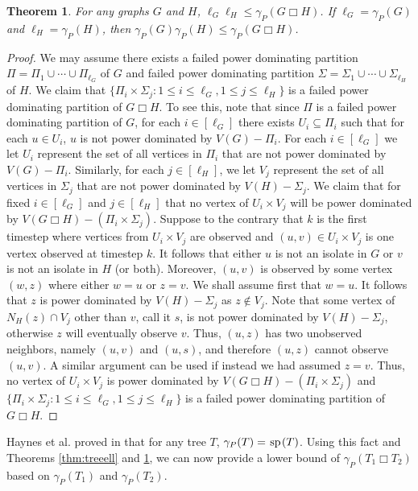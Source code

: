 \documentclass[11pt]{article}
\newtheorem{theorem}{Theorem}
\newcommand{\spider}{\hskip1pt \textrm{sp} \hskip1pt}
\begin{document}
\begin{theorem} For any graphs $G$ and $H$, $\ell_G \ell_H \leq \gamma_P(G \Box H)$. If $\ell_G = \gamma_P(G)$ and $\ell_H = \gamma_P(H)$, then $\gamma_P(G)\gamma_P(H) \leq \gamma_P(G \Box H)$.
\label{cartlowerbound}
\end{theorem}
\begin{proof}
We may assume there exists a failed power dominating partition $\Pi = \Pi_1 \cup \cdots \cup \Pi_{\ell_G}$ of $G$ and failed power dominating partition $\Sigma = \Sigma_1 \cup \cdots \cup \Sigma_{\ell_H}$ of $H$. We claim that $\{\Pi_i\times \Sigma_j: 1 \le i \le \ell_G, 1 \le j \le \ell_H\}$ is a failed power dominating partition of $G\Box H$. To see this, note that since $\Pi$ is a failed power dominating partition of $G$, for each $i \in [\ell_G]$ there exists $U_i \subseteq \Pi_i$ such that  for each $u \in U_i$, $u$ is not power dominated by $V(G) - \Pi_i$. For each $i\in [\ell_G]$ we let $U_i$ represent the set of all vertices in $\Pi_i$ that are not power dominated by $V(G) - \Pi_i$. Similarly, for each $j \in [\ell_H]$, we let $V_j$ represent the set of all vertices in $\Sigma_j$ that are not power dominated by $V(H) - \Sigma_j$. We claim that for fixed $i \in [\ell_G]$ and $j \in [\ell_H]$ that no vertex of $U_i \times V_j$ will be power dominated by $V(G\Box H) - (\Pi_i \times \Sigma_j)$. Suppose to the contrary that $k$ is the first timestep where vertices from $U_i \times V_j$ are observed and $(u, v) \in U_i \times V_j$ is one vertex observed at timestep $k$. It follows that either $u$ is not an isolate in $G$ or $v$ is not an isolate in $H$ (or both). Moreover,  $(u,v)$ is observed by some vertex $(w, z)$ where either $w=u$ or $z=v$. We shall assume first that $w=u$. It follows that $z$ is power dominated by $V(H) - \Sigma_j$ as $z\not\in V_j$. Note that some vertex of $N_H(z) \cap V_j$ other than $v$, call it $s$, is not power dominated by $V(H) - \Sigma_j$, otherwise $z$ will eventually observe $v$. Thus, $(u,z)$ has two unobserved neighbors, namely $(u, v)$ and $(u,s)$, and therefore $(u,z)$ cannot observe $(u,v)$. A similar argument can be used if instead we had assumed $z=v$. Thus, no vertex of $U_i \times V_j$ is power dominated by $V(G\Box H) - (\Pi_i \times \Sigma_j)$ and $\{\Pi_i\times \Sigma_j: 1 \le i \le \ell_G, 1 \le j \le \ell_H\}$ is a failed power dominating partition of $G\Box H$. 
\end{proof}

Haynes et al. proved in \cite{electricgrids} that for any tree $T$, $\gamma_P(T) = \spider(T)$. Using this fact and Theorems \ref{thm:treeell} and \ref{cartlowerbound}, we can now provide a lower bound of $\gamma_P(T_1 \Box T_2)$ based on $\gamma_P(T_1)$ and $\gamma_P(T_2)$.
\end{document}
